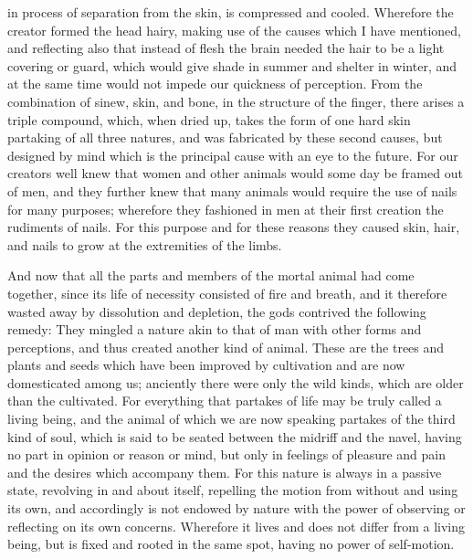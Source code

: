 \documentclass[11pt,letter]{article}
\begin{document}
in process of separation from the skin, is compressed and cooled. Wherefore the creator formed the head hairy, making use of the causes which I have mentioned, and reflecting also that instead of flesh the brain needed the hair to be a light covering or guard, which would give shade in summer and shelter in winter, and at the same time would not impede our quickness of perception. From the combination of sinew, skin, and bone, in the structure of the finger, there arises a triple compound, which, when dried up, takes the form of one hard skin partaking of all three natures, and was fabricated by these second causes, but designed by mind which is the principal cause with an eye to the future. For our creators well knew that women and other animals would some day be framed out of men, and they further knew that many animals would require the use of nails for many purposes; wherefore they fashioned in men at their first creation the rudiments of nails. For this purpose and for these reasons they caused skin, hair, and nails to grow at the extremities of the limbs.

\par  And now that all the parts and members of the mortal animal had come together, since its life of necessity consisted of fire and breath, and it therefore wasted away by dissolution and depletion, the gods contrived the following remedy: They mingled a nature akin to that of man with other forms and perceptions, and thus created another kind of animal. These are the trees and plants and seeds which have been improved by cultivation and are now domesticated among us; anciently there were only the wild kinds, which are older than the cultivated. For everything that partakes of life may be truly called a living being, and the animal of which we are now speaking partakes of the third kind of soul, which is said to be seated between the midriff and the navel, having no part in opinion or reason or mind, but only in feelings of pleasure and pain and the desires which accompany them. For this nature is always in a passive state, revolving in and about itself, repelling the motion from without and using its own, and accordingly is not endowed by nature with the power of observing or reflecting on its own concerns. Wherefore it lives and does not differ from a living being, but is fixed and rooted in the same spot, having no power of self-motion.
\end{document}

